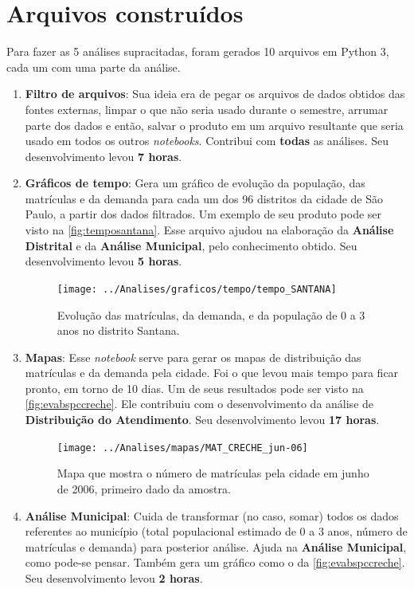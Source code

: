 \documentclass[12pt, a4paper]{article}
\begin{document}
\section{Arquivos construídos}

Para fazer as 5 análises supracitadas, foram gerados 10 arquivos em Python 3, cada um com uma parte da análise.

\begin{enumerate}
	\item \textbf{Filtro de arquivos}: Sua ideia era de pegar os arquivos de dados obtidos das fontes externas, limpar o que não seria usado durante o semestre, arrumar parte dos dados e então, salvar o produto em um arquivo resultante que seria usado em todos os outros \textit{notebooks}. Contribui com \textbf{todas} as análises. Seu desenvolvimento levou \textbf{7 horas}.
	\item \textbf{Gráficos de tempo}: Gera um gráfico de evolução da população, das matrículas e da demanda para cada um dos 96 distritos da cidade de São Paulo, a partir dos dados filtrados. Um exemplo de seu produto pode ser visto na \autoref{fig:temposantana}. Esse arquivo ajudou na elaboração da \textbf{Análise Distrital} e da \textbf{Análise Municipal}, pelo conhecimento obtido. Seu desenvolvimento levou \textbf{5 horas}.
	\begin{figure}[H]
		\centering
		\texttt{[image: ../Analises/graficos/tempo/tempo\_SANTANA]}
		\caption{Evolução das matrículas, da demanda, e da população de 0 a 3 anos no distrito Santana.}
		\label{fig:temposantana}
	\end{figure}
	\item \textbf{Mapas}: Esse \textit{notebook} serve para gerar os mapas de distribuição das matrículas e da demanda pela cidade. Foi o que levou mais tempo para ficar pronto, em torno de 10 dias. Um de seus resultados pode ser visto na \autoref{fig:evabspccreche}. Ele contribuiu com o desenvolvimento da análise de \textbf{Distribuição do Atendimento}. Seu desenvolvimento levou \textbf{17 horas}.
	\begin{figure}[H]
		\centering
		\texttt{[image: ../Analises/mapas/MAT\_CRECHE\_jun-06]}
		\caption{Mapa que mostra o número de matrículas pela cidade em junho de 2006, primeiro dado da amostra.}
		\label{fig:evabspccreche}
	\end{figure}
	\item \textbf{Análise Municipal}: Cuida de transformar (no caso, somar) todos os dados referentes ao município (total populacional estimado de 0 a 3 anos, número de matrículas e demanda) para posterior análise. Ajuda na \textbf{Análise Municipal}, como pode-se pensar. Também gera um gráfico como o da \autoref{fig:evabspccreche}. Seu desenvolvimento levou \textbf{2 horas}.

\end{enumerate}
\end{document}
